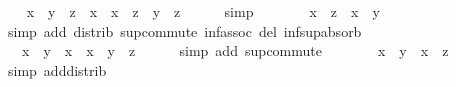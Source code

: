 \begin{isabellebody}
%
\isadelimproof
%
\endisadelimproof
%
\isatagproof
{}\isamarkupfalse%
{\isacharminus}{\kern0pt}\isanewline
\ \ \isamarkupfalse%
\ {\isachardoublequoteopen}x\ {\isasymsqinter}\ {\isacharparenleft}{\kern0pt}y\ {\isasymsqunion}\ z{\isacharparenright}{\kern0pt}\ {\isacharequal}{\kern0pt}\ {\isacharparenleft}{\kern0pt}x\ {\isasymsqinter}\ {\isacharparenleft}{\kern0pt}x\ {\isasymsqunion}\ z{\isacharparenright}{\kern0pt}{\isacharparenright}{\kern0pt}\ {\isasymsqinter}\ {\isacharparenleft}{\kern0pt}y\ {\isasymsqunion}\ z{\isacharparenright}{\kern0pt}{\isachardoublequoteclose}\isanewline
\ \ \ \ \isamarkupfalse%
\ simp\isanewline
\ \ \isamarkupfalse%
\ \isamarkupfalse%
\ {\isachardoublequoteopen}{\isasymdots}\ {\isacharequal}{\kern0pt}\ x\ {\isasymsqinter}\ {\isacharparenleft}{\kern0pt}z\ {\isasymsqunion}\ {\isacharparenleft}{\kern0pt}x\ {\isasymsqinter}\ y{\isacharparenright}{\kern0pt}{\isacharparenright}{\kern0pt}{\isachardoublequoteclose}\isanewline
\ \ \ \ \isamarkupfalse%
\ {\isacharparenleft}{\kern0pt}simp\ add{\isacharcolon}{\kern0pt}\ distrib\ sup{\isacharunderscore}{\kern0pt}commute\ inf{\isacharunderscore}{\kern0pt}assoc\ del{\isacharcolon}{\kern0pt}\ inf{\isacharunderscore}{\kern0pt}sup{\isacharunderscore}{\kern0pt}absorb{\isacharparenright}{\kern0pt}\isanewline
\ \ \isamarkupfalse%
\ \isamarkupfalse%
\ {\isachardoublequoteopen}{\isasymdots}\ {\isacharequal}{\kern0pt}\ {\isacharparenleft}{\kern0pt}{\isacharparenleft}{\kern0pt}x\ {\isasymsqinter}\ y{\isacharparenright}{\kern0pt}\ {\isasymsqunion}\ x{\isacharparenright}{\kern0pt}\ {\isasymsqinter}\ {\isacharparenleft}{\kern0pt}{\isacharparenleft}{\kern0pt}x\ {\isasymsqinter}\ y{\isacharparenright}{\kern0pt}\ {\isasymsqunion}\ z{\isacharparenright}{\kern0pt}{\isachardoublequoteclose}\isanewline
\ \ \ \ \isamarkupfalse%
\ {\isacharparenleft}{\kern0pt}simp\ add{\isacharcolon}{\kern0pt}\ sup{\isacharunderscore}{\kern0pt}commute{\isacharparenright}{\kern0pt}\isanewline
\ \ \isamarkupfalse%
\ \isamarkupfalse%
\ {\isachardoublequoteopen}{\isasymdots}\ {\isacharequal}{\kern0pt}\ {\isacharparenleft}{\kern0pt}x\ {\isasymsqinter}\ y{\isacharparenright}{\kern0pt}\ {\isasymsqunion}\ {\isacharparenleft}{\kern0pt}x\ {\isasymsqinter}\ z{\isacharparenright}{\kern0pt}{\isachardoublequoteclose}\ \isamarkupfalse%
\ {\isacharparenleft}{\kern0pt}simp\ add{\isacharcolon}{\kern0pt}distrib{\isacharparenright}{\kern0pt}\isanewline
\ \ \isamarkupfalse%

\end{isabellebody}
